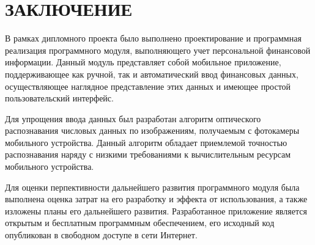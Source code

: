 \section*{ЗАКЛЮЧЕНИЕ}

В рамках дипломного проекта было выполнено проектирование и
программная реализация программного модуля,
выполняющего учет персональной финансовой информации.
Данный модуль представляет собой мобильное приложение,
поддерживающее как ручной, так и автоматический ввод
финансовых данных, осуществляющее наглядное представление этих данных
и имеющее простой пользовательский интерфейс.

Для упрощения ввода данных был разработан
алгоритм оптического распознавания числовых данных по изображениям,
получаемым с фотокамеры мобильного устройства.
Данный алгоритм обладает приемлемой точностью распознавания
наряду с низкими требованиями к
вычислительным ресурсам мобильного устройства.

Для оценки перпективности дальнейшего развития программного модуля
была выполнена оценка затрат на его разработку и эффекта от использования,
а также изложены планы его дальнейшего развития.
Разработанное приложение является открытым и бесплатным программным обеспечением,
его исходный код опубликован в свободном доступе в сети Интернет.